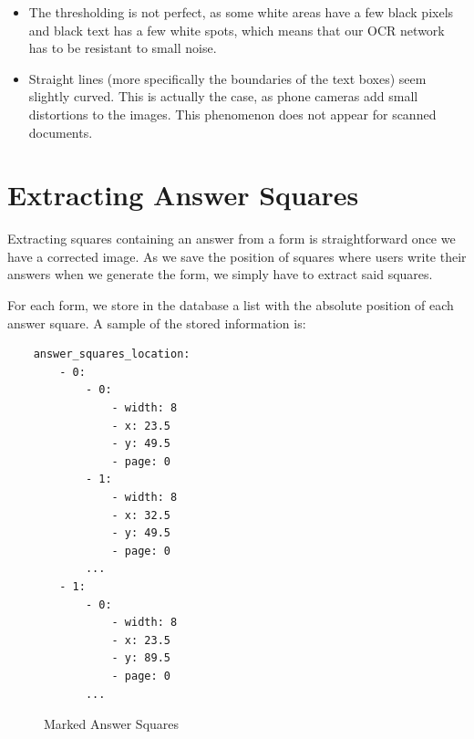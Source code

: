 \documentclass[11pt, a4paper]{report}
\begin{document}
\begin{itemize}
	\item The thresholding is not perfect, as some white areas have a few black pixels and black text has a few white spots, which means that our OCR network has to be resistant to small noise.
	\item Straight lines (more specifically the boundaries of the text boxes) seem slightly curved. This is actually the case, as phone cameras add small distortions to the images. This phenomenon does not appear for scanned documents.
\end{itemize}

\section{Extracting Answer Squares}

Extracting squares containing an answer from a form is straightforward once we have a corrected image. As we save the position of squares where users write their answers when we generate the form, we simply have to extract said squares.

For each form, we store in the database a list with the absolute position of each answer square. A sample of the stored information is:

\begin{verbatim}
    answer_squares_location:
        - 0:
            - 0:
                - width: 8
                - x: 23.5
                - y: 49.5
                - page: 0
            - 1:
                - width: 8
                - x: 32.5
                - y: 49.5
                - page: 0
            ...
        - 1:
            - 0:
                - width: 8
                - x: 23.5
                - y: 89.5
                - page: 0
            ...
\end{verbatim}

\begin{figure}[!h]
	\centering
	\caption{Marked Answer Squares}
	\label{answer-squares-red}
\end{figure}
\end{document}

